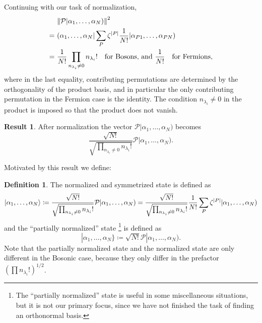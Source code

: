 \documentclass{article}
\theoremstyle{definition}
\newtheorem{res}{Result}[section]
\newtheorem{dfn}{Definition}[section]
\theoremstyle{plain}
\numberwithin{equation}{section}
\begin{document}
    Continuing with our task of normalization, 
    \begin{align*}
        &\ \norm{\mathcal{P} |\alpha_1, \ldots ,\alpha_{N})}^{2} \\
        =&\ 
        (\alpha_1, \ldots ,\alpha_{N}|
        \sum_{P}\zeta^{\abs{P}} \frac{1}{N!}
        |\alpha_{P1}, \ldots ,\alpha_{PN}) \\
        =&\ 
        \frac{1}{N!} \prod_{n_{\lambda_{i}} \neq 0} n_{\lambda_{i}} ! 
        \quad \text{for Bosons, and } 
        \frac{1}{N!} \quad \text{for Fermions},
    \end{align*}
    where in the last equality, 
    contributing permutations are determined 
    by the orthogonality of the product basis, and 
    in particular the only contributing permutation 
    in the Fermion case is the identity. 
    The condition $n_{\lambda_{i}}\neq 0$ in the product 
    is imposed 
    so that the product does not vanish. 

    \begin{graybox}
    \begin{res}
        After normalization the vector 
        $\mathcal{P}|\alpha_1, \ldots ,\alpha_{N})$
        becomes 
        \[
        \frac{\sqrt{N!}}{\sqrt{\prod_{n_{\lambda_{i}}\neq 0}n_{\lambda_{i}}!}}
        \mathcal{P}|\alpha_1, \ldots ,\alpha_{N}).
        \]
    \label{res:normalization-of-scrambled-states}
    \end{res}
    \end{graybox}

    Motivated by this result we define: 

    \begin{dfn}
        The normalized and symmetrized state 
        is defined as
        \begin{equation}
            \ket{\alpha_1, \ldots ,\alpha_{N}}
            \coloneqq
        \frac{\sqrt{N!}}{\sqrt{\prod_{n_{\lambda_{i}}\neq 0}n_{\lambda_{i}}!}}
        \mathcal{P}|\alpha_1, \ldots ,\alpha_{N})
        =
        \frac{\sqrt{N!}}{\sqrt{\prod_{n_{\lambda_{i}}\neq 0}n_{\lambda_{i}}!}}
        \frac{1}{N!} \sum_{P}\zeta^{\abs{P}}
        |\alpha_1, \ldots ,\alpha_{N})
        \end{equation}
        and the ``partially normalized'' state 
        \footnote{
        The ``partially normalized'' state is useful in some 
        miscellaneous situations, but it is not our primary focus, since 
        we have not finished the task of finding an orthonormal basis. 
        }
        is defined as
        \begin{equation}
            |\alpha_1, \ldots ,\alpha_{N}\}
            \coloneqq
            \sqrt{N!} \mathcal{P} |\alpha_1, \ldots ,\alpha_{N}).
        \end{equation}
        Note that the partially normalized state and the normalized state 
        are only different in the Bosonic case, because they only 
        differ in the prefactor $\left( \prod n_{\lambda_{i}}! \right)^{1 /2}$. 
        \label{dfn:normalized-states-and-partially-normalized-states}
    \end{dfn}
\end{document}
